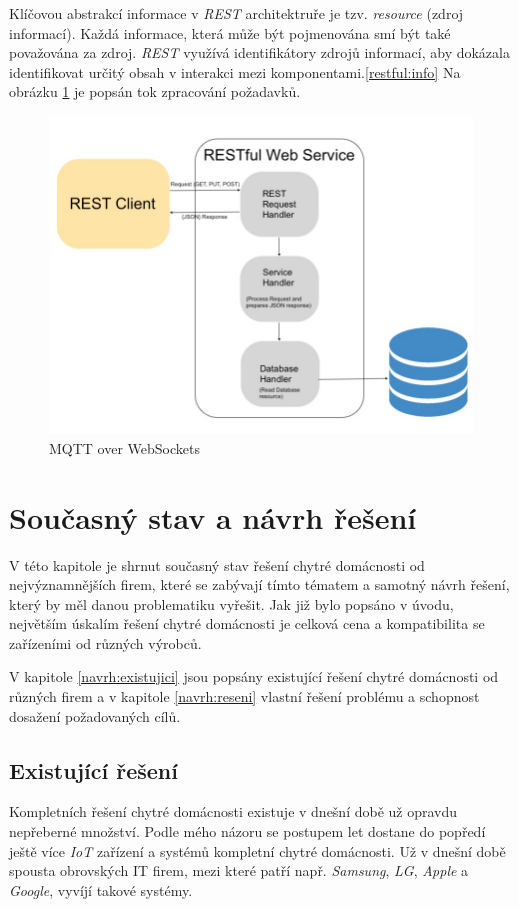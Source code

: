 Klíčovou abstrakcí informace v \emph{REST} architektruře je tzv. \emph{resource} (zdroj informací).
Každá informace, která může být pojmenována smí být také považována za zdroj.
\emph{REST} využívá identifikátory zdrojů informací, aby dokázala identifikovat určitý obsah v interakci mezi komponentami.\ref{restful:info}
Na obrázku \ref{figure:restful} je popsán tok zpracování požadavků.

\begin{figure}[ht]
  \centering
  \includegraphics[width=.59 \linewidth]{obrazky-figures/restful.jpg}
  \caption{MQTT over WebSockets}
  \label{figure:restful}
\end{figure}

\chapter{Současný stav a návrh řešení}
\label{navrh}

V této kapitole je shrnut současný stav řešení chytré domácnosti od nejvýznamnějších firem, které se zabývají tímto tématem a samotný návrh řešení, který by měl danou problematiku vyřešit.
Jak již bylo popsáno v úvodu, největším úskalím řešení chytré domácnosti je celková cena a kompatibilita se zařízeními od různých výrobců.

V kapitole \ref{navrh:existujici} jsou popsány existující řešení chytré domácnosti od různých firem a v kapitole \ref{navrh:reseni} vlastní řešení problému a schopnost dosažení požadovaných cílů.

\section*{Existující řešení}
\label{navrh:existujici}

Kompletních řešení chytré domácnosti existuje v dnešní době už opravdu nepřeberné množství. Podle mého názoru se postupem let dostane do popředí ještě více \emph{IoT} zařízení a systémů kompletní chytré domácnosti.
Už v dnešní době spousta obrovských IT firem, mezi které patří např. \emph{Samsung}, \emph{LG}, \emph{Apple} a \emph{Google}, vyvíjí takové systémy.

